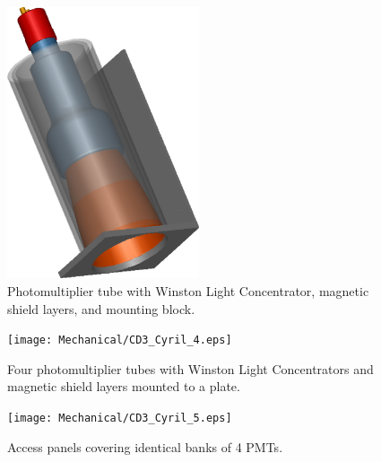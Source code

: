 \begin{figure}[h]
\vspace{0.5cm}
\begin{centering}
\includegraphics[height=8.0cm,angle=-0]{Mechanical/CD3_Cyril_3.eps}
\hspace{0.1cm}
\caption{\small{Photomultiplier tube with Winston Light Concentrator, 
magnetic shield layers, and mounting block.}}
\label{bracket}
\end{centering}
\end{figure}

\begin{figure}[h]
\begin{centering}
\texttt{[image: Mechanical/CD3\_Cyril\_4.eps]}
\hspace{0.1cm}
\caption{\small{Four photomultiplier tubes with Winston Light Concentrators 
and magnetic shield layers mounted to a plate.}}
\label{plate}
\end{centering}
\end{figure}

\begin{figure}[h]
\vspace{0.5cm}
\begin{centering}
\texttt{[image: Mechanical/CD3\_Cyril\_5.eps]}
\hspace{0.1cm}
\caption{\small{Access panels covering identical banks of 4 PMTs.}}
\label{pannels}
\end{centering}
\end{figure}

